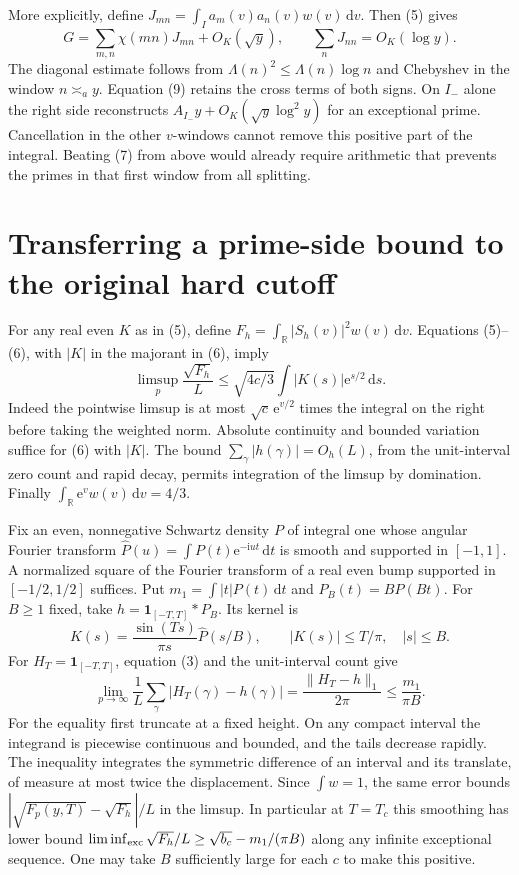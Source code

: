 \documentclass[11pt]{article}
\newcommand{\R}{\mathbb R}
\newcommand{\e}{\mathrm e}
\newcommand{\ii}{\mathrm i}
\newcommand{\wt}{\mathrm d}
\newcommand{\ind}{\mathbf 1}
\begin{document}
More explicitly, define $J_{mn}=\int_I a_m(v)a_n(v)w(v)\,\wt v$.
Then (5) gives
\[
 G=\sum_{m,n}\chi(mn)J_{mn}+O_K(\sqrt y),\qquad
 \sum_n J_{nn}=O_K(\log y).
 \tag{9}
\]
The diagonal estimate follows from $\Lambda(n)^2\le\Lambda(n)\log n$
and Chebyshev in the window $n\asymp_a y$. Equation (9) retains the
cross terms of both signs. On $I_-$ alone the right side reconstructs
$A_{I_-}y+O_K(\sqrt y\log^2 y)$ for an exceptional prime. Cancellation
in the other $v$-windows cannot remove this positive part of the
integral. Beating (7) from above would already require arithmetic
that prevents the primes in that first window from all splitting.

\section{Transferring a prime-side bound to the original hard cutoff}
For any real even $K$ as in (5), define
$F_h=\int_{\R}|S_h(v)|^2w(v)\,\wt v$. Equations (5)--(6), with
$|K|$ in the majorant in (6), imply
\[
 \limsup_p\frac{\sqrt{F_h}}{L}\le
 \sqrt{4c/3}\int |K(s)|\e^{s/2}\,\wt s.
 \tag{10}
\]
Indeed the pointwise limsup is at most $\sqrt c\,\e^{v/2}$
times the integral on the right before taking the weighted norm.
Absolute continuity and bounded variation suffice for (6) with $|K|$.
The bound $\sum_\gamma |h(\gamma)|=O_h(L)$, from the unit-interval
zero count and rapid decay, permits integration of the limsup by
domination. Finally $\int_{\R}\e^vw(v)\,\wt v=4/3$.

Fix an even, nonnegative Schwartz density $P$ of integral one whose
angular Fourier transform $\widehat P(u)=\int P(t)\e^{-\ii ut}\,\wt t$
is smooth and supported in $[-1,1]$. A normalized square of the
Fourier transform of a real even bump supported in $[-1/2,1/2]$
suffices. Put $m_1=\int|t|P(t)\,\wt t$ and $P_B(t)=BP(Bt)$.
For $B\ge1$ fixed, take $h=\ind_{[-T,T]}*P_B$. Its kernel is
\[
 K(s)=\frac{\sin(Ts)}{\pi s}\widehat P(s/B),\qquad
 |K(s)|\le T/\pi,\quad |s|\le B .
\]
For $H_T=\ind_{[-T,T]}$, equation (3) and the unit-interval count
give
\[
 \lim_{p\to\infty}\frac{1}{L}\sum_\gamma|H_T(\gamma)-h(\gamma)|
 =\frac{\|H_T-h\|_1}{2\pi}\le\frac{m_1}{\pi B}.
\]
For the equality first truncate at a fixed height. On any compact
interval the integrand is piecewise continuous and bounded, and the
tails decrease rapidly. The inequality integrates the symmetric
difference of an interval and its translate, of measure at most
twice the displacement. Since $\int w=1$, the same error bounds
$|\sqrt{F_p(y,T)}-\sqrt{F_h}|/L$ in the limsup. In particular at
$T=T_c$ this smoothing has lower bound
$\liminf_{\rm exc}\sqrt{F_h}/L\ge\sqrt{b_c}-m_1/(\pi B)$ along
any infinite exceptional sequence. One may take $B$ sufficiently
large for each $c$ to make this positive.
\end{document}
